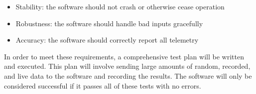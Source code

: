\documentclass[10pt,journal,draftclsnofoot,onecolumn]{IEEEtran}
\begin{document}
	\begin{itemize}
		\item Stability: the software should not crash or otherwise cease operation
		\item Robustness: the software should handle bad inputs gracefully
		\item Accuracy: the software should correctly report all telemetry
	\end{itemize}
	
	In order to meet these requirements, a comprehensive test plan will
	be written and executed. This plan will involve sending large amounts
	of random, recorded, and live data to the software and recording the results.
	The software will only be considered successful if it passes all of these
	tests with no errors.
	
\end{document}
